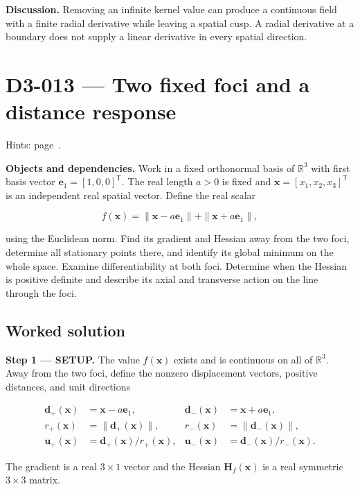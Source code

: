 \documentclass[11pt,oneside,openany]{book}
\begin{document}
\textbf{Discussion.} Removing an infinite kernel value can produce a continuous field with a finite radial derivative while leaving a spatial cusp. A radial derivative at a boundary does not supply a linear derivative in every spatial direction.
\clearpage
\section{D3-013 --- Two fixed foci and a distance response}
\label{problem:D3-013}
{\small Hints: page~\pageref{hints:D3-013}.}\par\medskip

\textbf{Objects and dependencies.} Work in a fixed orthonormal basis of \(\mathbb R^3\) with first basis vector \(\mathbf e_1=[1,0,0]^{\mathsf T}\). The real length \(a>0\) is fixed and \(\mathbf x=[x_1,x_2,x_3]^{\mathsf T}\) is an independent real spatial vector. Define the real scalar

\[
f(\mathbf x)=\|\mathbf x-a\mathbf e_1\|+\|\mathbf x+a\mathbf e_1\|,
\]

using the Euclidean norm. Find its gradient and Hessian away from the two foci, determine all stationary points there, and identify its global minimum on the whole space. Examine differentiability at both foci. Determine when the Hessian is positive definite and describe its axial and transverse action on the line through the foci.
\subsection*{Worked solution}

\textbf{Step 1 --- SETUP.} The value \(f(\mathbf x)\) exists and is continuous on all of \(\mathbb R^3\). Away from the two foci, define the nonzero displacement vectors, positive distances, and unit directions

\[
\begin{aligned}
\mathbf d_+(\mathbf x)&=\mathbf x-a\mathbf e_1,&
\mathbf d_-(\mathbf x)&=\mathbf x+a\mathbf e_1,\\
r_+(\mathbf x)&=\|\mathbf d_+(\mathbf x)\|,&
r_-(\mathbf x)&=\|\mathbf d_-(\mathbf x)\|,\\
\mathbf u_+(\mathbf x)&=\mathbf d_+(\mathbf x)/r_+(\mathbf x),&
\mathbf u_-(\mathbf x)&=\mathbf d_-(\mathbf x)/r_-(\mathbf x).
\end{aligned}
\]

The gradient is a real \(3\times1\) vector and the Hessian \(\mathbf H_f(\mathbf x)\) is a real symmetric \(3\times3\) matrix.
\end{document}
